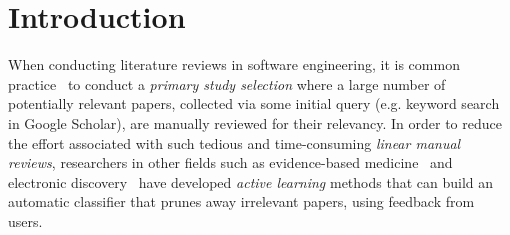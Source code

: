 \documentclass{svjour3}
\theoremstyle{break}
\begin{document}
 

\section{Introduction}
\label{sect: Introduction}

When conducting literature reviews in
 software engineering, it is common practice~\cite{kitchenham2013systematic} to
 conduct  a {\em primary study selection} where
 a large number of potentially
 relevant papers, collected via some initial query (e.g. keyword search in Google Scholar), are manually reviewed for their relevancy. In order to reduce the effort associated with such tedious and time-consuming
{\em linear manual reviews}, researchers in   other  fields such as   evidence-based medicine~\cite{paynter2016epc,wallace2010semi,wallace2010active} and  
electronic discovery~\cite{cormack2014evaluation,cormack2015autonomy} have developed {\em active learning}
methods that can build an automatic classifier
that prunes away irrelevant papers,  using feedback from users.
\end{document}
